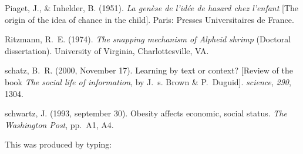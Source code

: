 \documentclass[]{interact}
\theoremstyle{plain}%
\theoremstyle{definition}
\theoremstyle{remark}
\begin{document}
\begin{thebibliography}{}
Piaget, J., \& Inhelder, B. (1951). \emph{La gen{\`e}se de l'id{\'e}e de
 hasard chez l'enfant} [The origin of the idea of chance in the child]. Paris:
 Presses Universitaires de France.

Ritzmann, R.~E. (1974). \emph{The snapping mechanism of \emph{Alpheid} shrimp}
 (Doctoral dissertation). University of Virginia, Charlottesville, VA.

schatz, B.~R. (2000, November 17). Learning by text or context? [Review of the
 book \emph{The social life of information}, by J.~s. Brown \& P.~Duguid].
\emph{science}, \emph{290}, 1304.

schwartz, J. (1993, september 30). Obesity affects economic, social status.
 \emph{The Washington Post}, pp.~A1, A4.

\end{thebibliography}
\bigskip
\noindent This was produced by typing:
\end{document}
